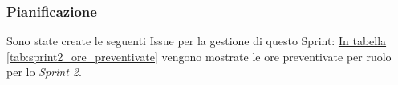 \subsubsection{Pianificazione}

Sono state create le seguenti Issue per la gestione di questo Sprint: 
\hyperref[tab:sprint2_ore_preventivate]{In tabella \ref{tab:sprint2_ore_preventivate}} vengono mostrate le ore preventivate per ruolo per lo \textit{Sprint 2}.

\begin{table}[H]
    \centering
    \caption{Ore preventivate per ruolo Sprint 2}
    \label{tab:sprint2_ore_preventivate}
\end{table}